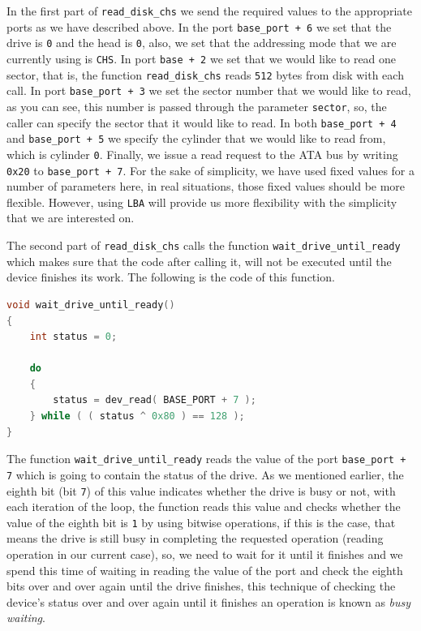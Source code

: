 In the first part of \lstinline!read_disk_chs! we send the required
values to the appropriate ports as we have described above. In the port
\lstinline!base_port + 6! we set that the drive is \lstinline!0! and the
head is \lstinline!0!, also, we set that the addressing mode that we are
currently using is \lstinline!CHS!. In port \lstinline!base + 2! we set
that we would like to read one sector, that is, the function
\lstinline!read_disk_chs! reads \lstinline!512! bytes from disk with
each call. In port \lstinline!base_port + 3! we set the sector number
that we would like to read, as you can see, this number is passed
through the parameter \lstinline!sector!, so, the caller can specify the
sector that it would like to read. In both \lstinline!base_port + 4! and
\lstinline!base_port + 5! we specify the cylinder that we would like to
read from, which is cylinder \lstinline!0!. Finally, we issue a read
request to the ATA bus by writing \lstinline!0x20! to
\lstinline!base_port + 7!. For the sake of simplicity, we have used
fixed values for a number of parameters here, in real situations, those
fixed values should be more flexible. However, using \lstinline!LBA!
will provide us more flexibility with the simplicity that we are
interested on.

The second part of \lstinline!read_disk_chs! calls the function
\lstinline!wait_drive_until_ready! which makes sure that the code after
calling it, will not be executed until the device finishes its work. The
following is the code of this function.

\begin{lstlisting}[language=C]
void wait_drive_until_ready()
{
    int status = 0;
    
    do
    {
        status = dev_read( BASE_PORT + 7 );
    } while ( ( status ^ 0x80 ) == 128 );
}
\end{lstlisting}

The function \lstinline!wait_drive_until_ready! reads the value of the
port \lstinline!base_port + 7! which is going to contain the status of
the drive. As we mentioned earlier, the eighth bit (bit \lstinline!7!)
of this value indicates whether the drive is busy or not, with each
iteration of the loop, the function reads this value and checks whether
the value of the eighth bit is \lstinline!1! by using bitwise
operations, if this is the case, that means the drive is still busy in
completing the requested operation (reading operation in our current
case), so, we need to wait for it until it finishes and we spend this
time of waiting in reading the value of the port and check the eighth
bits over and over again until the drive finishes, this technique of
checking the device's status over and over again until it finishes an
operation is known as \emph{busy waiting}.

